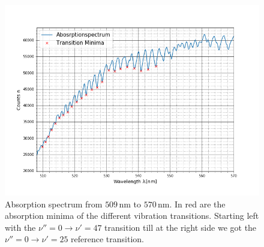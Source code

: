 \begin{figure}[ht]
	\includegraphics[scale=0.5]{Bild/AS_2}
	\centering
	\caption[Absorption Spectrum with Transitions]{\small Absorption spectrum from $509\,$nm to $570\,$nm. In red are the absorption minima of the different vibration transitions. Starting left with the $\nu''=0\rightarrow \nu'=47$ transition till at the right side we got the $\nu''=0\rightarrow \nu'=25$ reference transition.}
	\label{figAS2}
\end{figure}
\FloatBarrier

